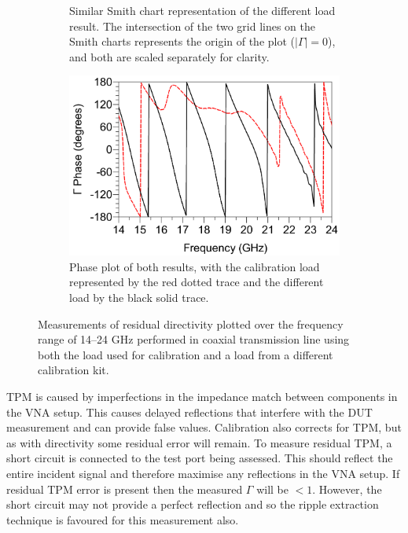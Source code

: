 \documentclass[../thesis/thesis.tex]{subfiles}
\begin{document}
\begin{refsection}
\begin{figure}
\begin{subfigure}{0.45\textwidth}
	    \caption{Similar Smith chart representation of the different load result. The intersection of the two grid lines on the Smith charts represents the origin of the plot ($|\Gamma|=0$), and both are scaled separately for clarity.}
    \end{subfigure}
	\par\bigskip
	\begin{subfigure}{0.6\textwidth}
	    \centering
		\includegraphics[width=\linewidth]{dir-c.png}
		\caption{Phase plot of both results, with the calibration load represented by the red dotted trace and the different load by the black solid trace.}
	\end{subfigure}
	\caption[Measurements of residual directivity performed in coaxial transmission line.]{Measurements of residual directivity plotted over the frequency range of 14--24 GHz performed in coaxial transmission line using both the load used for calibration and a load from a different calibration kit.}
	\label{ch4_fig_dir}
\end{figure}

TPM is caused by imperfections in the impedance match between components in the VNA setup. This causes delayed reflections that interfere with the DUT measurement and can provide false values. Calibration also corrects for TPM, but as with directivity some residual error will remain. To measure residual TPM, a short circuit is connected to the test port being assessed. This should reflect the entire incident signal and therefore maximise any reflections in the VNA setup. If residual TPM error is present then the measured $\Gamma$ will be $<1$. However, the short circuit may not provide a perfect reflection and so the ripple extraction technique is favoured for this measurement also.


\end{refsection}
\end{document}
